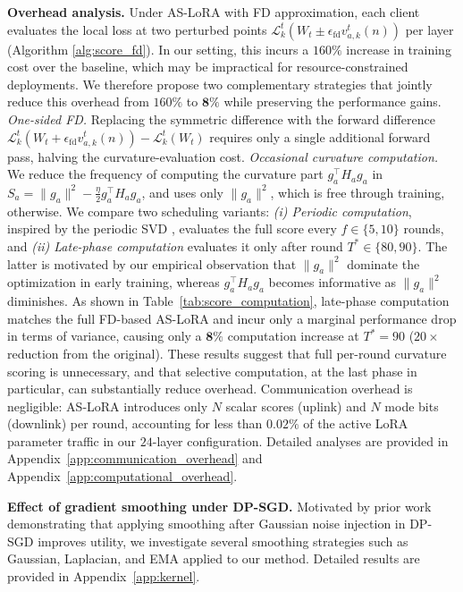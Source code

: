 \textbf{Overhead analysis.}
Under AS-LoRA with FD approximation, each client evaluates the local loss at two perturbed points 
$\mathcal{L}_k^t\!\left(W_t\pm \epsilon_{\mathrm{fd}} v_{a,k}^t(n)\right)$ per layer (Algorithm \ref{alg:score_fd}). In our setting, this incurs a $160\%$ increase in training cost over the baseline, which may be impractical for resource-constrained deployments. We therefore propose two complementary strategies that jointly reduce this overhead from $160\%$ to $\mathbf{8\%}$ while preserving the performance gains. \emph{One-sided FD.} Replacing the symmetric difference with the forward difference $\mathcal{L}_k^t\!\left(W_t+ \epsilon_{\mathrm{fd}} v_{a,k}^t(n)\right)- \mathcal{L}_k^t\!\left(W_t\right)$ requires only a single additional forward pass, halving the curvature-evaluation cost. \emph{Occasional curvature computation.} We reduce the frequency of computing the curvature part $g_a^\top H_a g_a$ in $S_a=\|g_a\|^2-\tfrac{\eta}{2}g_a^\top H_a g_a$, and uses only $\|g_a\|^2$, which is free through training, otherwise. We compare two scheduling variants: \emph{(i) Periodic computation}, inspired by the periodic SVD \cite{lee2025fedsvd}, evaluates the full score every $f \in \{5, 10\}$ rounds, and \emph{(ii) Late-phase computation} evaluates it only after round $T^* \in \{80, 90\}$. The latter is motivated by our empirical observation that $\|g_a\|^2$ dominate the optimization in early training, whereas $g_a^\top H_a g_a$ becomes informative as $\|g_a\|^2$ diminishes. As shown in Table~\ref{tab:score_computation}, late-phase computation matches the full FD-based AS-LoRA and incur only a marginal performance drop in terms of variance, causing only a $\mathbf{8\%}$ computation increase at $T^* = 90$ ($20\times$ reduction from the original). These results suggest that full per-round curvature scoring is unnecessary, and that selective computation, at the last phase in particular, can substantially reduce overhead. Communication overhead is negligible: AS-LoRA introduces only $N$ scalar scores (uplink) and $N$ mode bits (downlink) per round, accounting for less than $0.02\%$ of the active LoRA parameter traffic in our $24$-layer configuration. Detailed analyses are provided in Appendix~\ref{app:communication_overhead} and Appendix~\ref{app:computational_overhead}.

\textbf{Effect of gradient smoothing under DP-SGD.} 
Motivated by prior work~\cite{liu2026rethinking, liang2024differentially, wang2020dp} demonstrating that applying smoothing after Gaussian noise injection in DP-SGD improves utility, we investigate several smoothing strategies such as Gaussian, Laplacian, and EMA applied to our method. Detailed results are provided in Appendix~\ref{app:kernel}.

